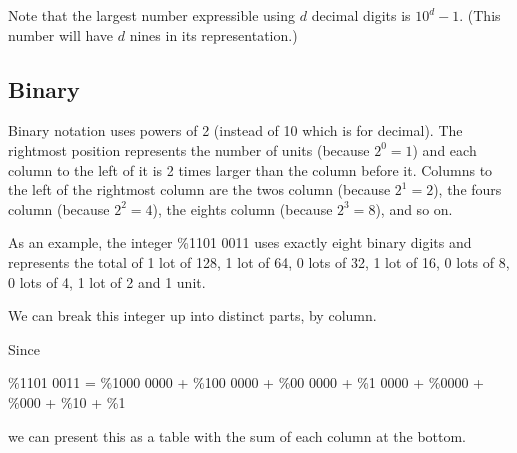 Note that the largest number expressible using $d$ decimal digits is $10^{d} - 1$. (This number will have $d$ nines in its representation.)

\subsection{Binary}
Binary notation uses powers of 2 (instead of 10 which is for decimal). The rightmost position represents the number of units (because $2^{0} = 1$) and each column to the left of it is 2 times larger than the column before it. Columns to the left of the rightmost column are the twos column (because $2^{1} = 2$), the fours column (because $2^{2} = 4$), the eights column (because $2^{3} = 8$), and so on.

As an example, the integer \%1101 0011 uses exactly eight binary digits and represents the total of 1 lot of 128, 1 lot of 64, 0 lots of 32, 1 lot of 16, 0 lots of 8, 0 lots of 4, 1 lot of 2 and 1 unit.

We can break this integer up into distinct parts, by column.

Since
\begin{center}
	\small{\%1101 0011} = \small{\%1000 0000} + \small{\%100 0000} + \small{\%00 0000} + \small{\%1 0000} + \small{\%0000} + \small{\%000} + \small{\%10} + \small{\%1}
\end{center}
we can present this as a table with the sum of each column at the bottom.

